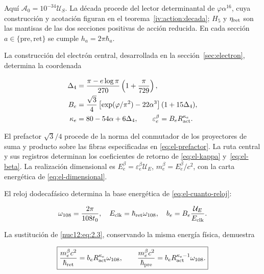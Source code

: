 Aquí \(\mathcal A_0=10^{-34}\mathcal U_S\). La década procede del lector determinantal de \(\varphi\alpha^{16}\), cuya construcción y acotación figuran en el teorema~\ref{iv:action:decada}; \(H_5\) y \(\eta_{\rm ret}\) son las mantisas de las dos secciones positivas de acción reducida. En cada sección \(a\in\{\mathrm{pre},\mathrm{ret}\}\) se cumple \(h_a=2\pi\hbar_a\).

La construcción del electrón central, desarrollada en la sección~\ref{sec:electron}, determina la coordenada



\begin{equation}
\begin{aligned}
\Delta_4&=\frac{\pi-e\log\pi}{270}\left(1+\frac{\pi}{729}\right),\\
B_e&=\frac{\sqrt3}{4}
\left[\exp(\varphi/\pi^2)-22\alpha^3\right](1+15\Delta_4),\\
\kappa_e&=80-54\alpha+6\Delta_4,\qquad
\varepsilon_e^\beta=B_eR_{\rm act}^{\kappa_e}.
\end{aligned}
\label{nuc12:eq:2.3}
\end{equation}



El prefactor \(\sqrt3/4\) procede de la norma del conmutador de los proyectores de suma y producto sobre las fibras especificadas en \eqref{eq:el-prefactor}. La ruta central y sus registros determinan los coeficientes de retorno de \eqref{eq:el-kappa} y~\eqref{eq:el-beta}. La realización dimensional es \(E_e^\beta=\varepsilon_e^\beta\mathcal U_E\), \(m_e^\beta=E_e^\beta/c^2\), con la carta energética de \eqref{eq:el-dimensional}.

El reloj dodecafásico determina la base energética de \eqref{eq:el-cuanto-reloj}:



\[
\omega_{108}=\frac{2\pi}{108t_0},\quad
E_{\rm clk}=\hbar_{\rm ret}\omega_{108},\quad
b_e=B_e\frac{\mathcal U_E}{E_{\rm clk}}.
\]



La sustitución de \eqref{nuc12:eq:2.3}, conservando la misma energía física, demuestra



\begin{equation}
\boxed{\frac{m_e^\beta c^2}{\hbar_{\rm ret}}
=b_eR_{\rm act}^{\kappa_e}\omega_{108},\qquad
\frac{m_e^\beta c^2}{\hbar_{\rm pre}}
=b_eR_{\rm act}^{\kappa_e-1}\omega_{108}.}
\label{nuc12:eq:2.4}
\end{equation}



